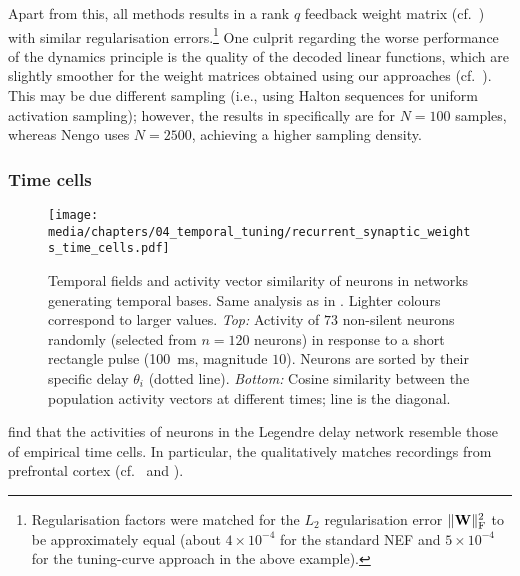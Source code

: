 Apart from this, all methods results in a rank $q$ feedback weight matrix (cf.~) with similar regularisation errors.\footnote{Regularisation factors were matched for the $L_2$ regularisation error $\|\mathbf{W}\|_\mathrm{F}^2$ to be approximately equal (about $4 \times 10^{-4}$ for the standard NEF and $5 \times 10^{-4}$ for the tuning-curve approach in the above example).}
One culprit regarding the worse performance of the \NEF dynamics principle is the quality of the decoded linear functions, which are slightly smoother for the weight matrices obtained using our approaches (cf.~).
This may be due different sampling (i.e., using Halton sequences for uniform activation sampling); however, the results in  specifically are for $N = 100$ samples, whereas Nengo uses $N = 2500$, achieving a higher sampling density.

\subsubsection{Time cells}

\begin{figure}
	\centering
	\texttt{[image: media/chapters/04\_temporal\_tuning/recurrent\_synaptic\_weights\_time\_cells.pdf]}%
	{\label{fig:recurrent_synaptic_weights_time_cells_a}}%
	{\label{fig:recurrent_synaptic_weights_time_cells_b}}%
	{\label{fig:recurrent_synaptic_weights_time_cells_c}}%
	\caption[Temporal fields and activity vector similarity of networks generating temporal bases]{
		Temporal fields and activity vector similarity of neurons in networks generating temporal bases.
		Same analysis as in .
		Lighter colours correspond to larger values.
		\emph{Top:} Activity of $73$ non-silent neurons randomly (selected from $n = 120$ neurons) in response to a short rectangle pulse (\SI{100}{\milli\second}, magnitude $10$). Neurons are sorted by their specific delay $\theta_i$ (dotted line).
		\emph{Bottom:} Cosine similarity between the population activity vectors at different times; line is the diagonal.
	}
	\label{fig:recurrent_synaptic_weights_time_cells}
\end{figure}

 find that the activities of neurons in the Legendre delay network resemble those of empirical time cells.
In particular, the \LDN qualitatively matches recordings from prefrontal cortex (cf.~\cite{tiganj2016sequential} and ).

